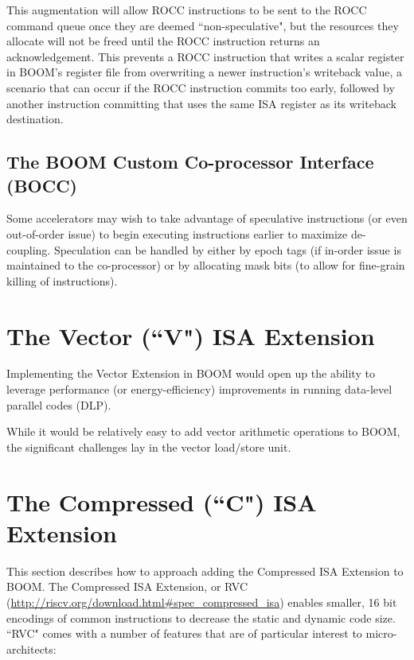 This augmentation will allow ROCC instructions to be sent to the ROCC command queue once they are deemed ``non-speculative", but the resources they allocate will not be freed until the ROCC instruction returns an acknowledgement.  This prevents a ROCC instruction that writes a scalar register in BOOM's register file from overwriting a newer instruction's writeback value, a scenario that can occur if the ROCC instruction commits too early, followed by another instruction committing that uses the same ISA register as its writeback destination. 


\subsection{The BOOM Custom Co-processor Interface (BOCC)}

Some accelerators may wish to take advantage of speculative instructions (or even out-of-order issue) to begin executing instructions earlier to maximize de-coupling.  Speculation can be handled by either by epoch tags (if in-order issue is maintained to the co-processor) or by allocating mask bits (to allow for fine-grain killing of instructions). 

\section{The Vector (``V") ISA Extension}

Implementing the Vector Extension in BOOM would open up the ability to leverage performance (or energy-efficiency) improvements in running data-level parallel codes (DLP). 

While it would be relatively easy to add vector arithmetic operations to BOOM, the significant challenges lay in the vector load/store unit. 



\section{The Compressed (``C") ISA Extension}

This section describes how to approach adding the Compressed ISA Extension to BOOM.  The Compressed ISA Extension, or RVC  (\url{http://riscv.org/download.html#spec_compressed_isa}) enables smaller, 16 bit encodings of common instructions to decrease the static and dynamic code size.  ``RVC" comes with a number of features that are of particular interest to micro-architects:

